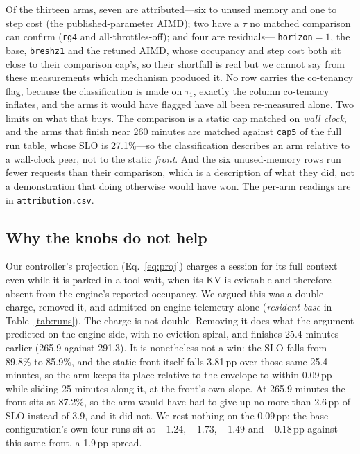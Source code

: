 Of the thirteen arms, seven are attributed---six to unused memory and one to step
cost (the published-parameter AIMD); two have a $\tau$
no matched comparison can confirm (\texttt{rg4} and all-throttles-off); and four
are residuals---%
\texttt{horizon}$=1$, the base, \texttt{breshz1} and the retuned AIMD, whose
occupancy and step cost both sit close to their comparison cap's, so their
shortfall is real but we cannot say from these measurements which mechanism
produced it. No row carries the co-tenancy flag, because the classification is
made on $\tau_1$, exactly the column co-tenancy inflates, and the arms it would
have flagged have all been re-measured alone. Two limits on what that buys. The
comparison is a static cap matched on \emph{wall clock}, and the arms that finish
near 260 minutes are matched against \texttt{cap5} of the full run table, whose SLO is 27.1\%---so the
classification describes an arm relative to a wall-clock peer, not to the static
\emph{front}. And the six unused-memory rows run fewer requests than their
comparison, which is a description of what they did, not a demonstration that
doing otherwise would have won. The per-arm readings are in
\texttt{attribution.csv}.

\subsection{Why the knobs do not help}
\label{sec:results:gate}

Our controller's projection (Eq.~\ref{eq:proj}) charges a session for its full
context even while it is parked in a tool wait, when its KV is evictable and
therefore absent from the engine's reported occupancy. We argued this was a
double charge, removed it, and admitted on engine telemetry alone (\emph{resident
base} in Table~\ref{tab:runs}). The charge is not double. Removing it does what
the argument predicted on the engine side, with no eviction spiral, and finishes
25.4 minutes earlier (265.9 against 291.3). It is nonetheless not a win: the SLO
falls from 89.8\% to 85.9\%, and the static front itself falls 3.81\,pp over
those same 25.4 minutes, so the arm keeps its place relative to the envelope to
within 0.09\,pp while sliding 25 minutes along it, at the front's own slope. At
265.9 minutes the front sits at 87.2\%, so the arm would have had to give up no
more than 2.6\,pp of SLO instead of 3.9, and it did not. We rest nothing on the
0.09\,pp: the base configuration's own four runs sit at $-1.24$, $-1.73$, $-1.49$
and $+0.18$\,pp against this same front, a 1.9\,pp spread.

